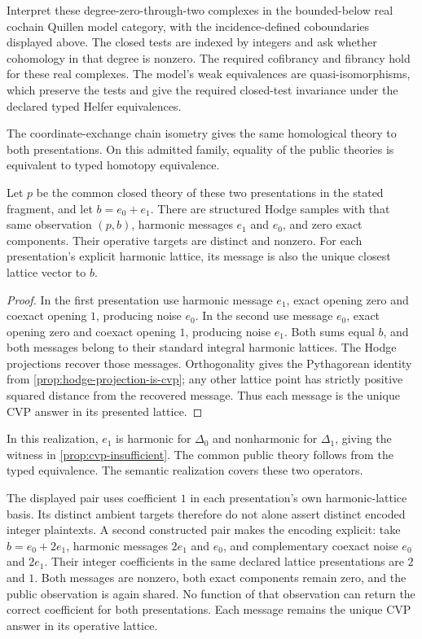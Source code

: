 Interpret these degree-zero-through-two complexes in the bounded-below
real cochain Quillen model category, with the incidence-defined coboundaries
displayed above. The closed tests are indexed by integers and ask whether
cohomology in that degree is nonzero. The required cofibrancy and fibrancy
hold for these real complexes. The model's weak equivalences are
quasi-isomorphisms, which preserve the tests and give the required
closed-test invariance under the declared typed Helfer equivalences.

The coordinate-exchange chain isometry gives the same homological theory
to both presentations. On this admitted family, equality of the public
theories is equivalent to typed homotopy equivalence.

\begin{proposition}
  \label{prop:cellular-axis-ambiguity}
  Let \(p\) be the common closed theory of these two presentations in the
  stated fragment, and let \(b=e_0+e_1\). There are structured Hodge samples
  with that same observation \((p,b)\), harmonic messages \(e_1\) and \(e_0\),
  and zero exact components. Their operative targets are distinct and nonzero.
  For each presentation's explicit harmonic lattice, its message is also the
  unique closest lattice vector to \(b\).
\end{proposition}

\begin{proof}
  In the first presentation use harmonic message \(e_1\), exact opening zero
  and coexact opening \(1\), producing noise \(e_0\). In the second use
  message \(e_0\), exact opening zero and coexact opening \(1\), producing
  noise \(e_1\). Both sums equal \(b\), and both messages belong to their
  standard integral harmonic lattices. The Hodge projections recover
  those messages. Orthogonality gives the Pythagorean identity from
  \cref{prop:hodge-projection-is-cvp}; any other lattice point has strictly
  positive squared distance from the recovered message. Thus each message
  is the unique CVP answer in its presented lattice.
\end{proof}

In this realization, \(e_1\) is harmonic for \(\Delta_0\) and
nonharmonic for \(\Delta_1\), giving the witness in
\cref{prop:cvp-insufficient}. The common public theory follows from the
typed equivalence. The semantic realization covers these two operators.

The displayed pair uses coefficient \(1\) in each presentation's own
harmonic-lattice basis. Its distinct ambient targets therefore do not alone
assert distinct encoded integer plaintexts. A second constructed pair makes
the encoding explicit: take \(b=e_0+2e_1\), harmonic messages \(2e_1\) and
\(e_0\), and complementary coexact noise \(e_0\) and \(2e_1\). Their integer
coefficients in the same declared lattice presentations are \(2\) and \(1\).
Both messages are nonzero, both exact components remain zero, and the public
observation is again shared. No function of that observation can return the
correct coefficient for both presentations. Each message remains the unique
CVP answer in its operative lattice.

